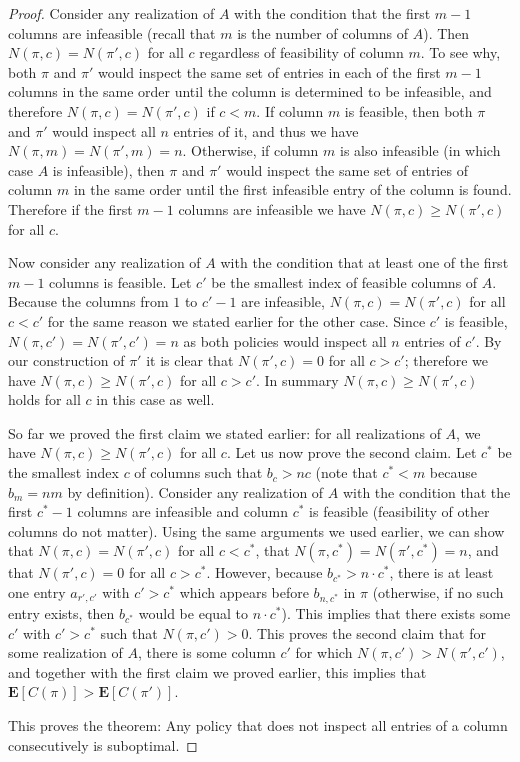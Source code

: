 \begin{proof}
 Consider any realization of $A$ with the condition that the first $m-1$ columns are infeasible (recall that $m$ is the number of columns of $A$).
 Then $N(\pi, c) = N(\pi', c)$ for all $c$ regardless of feasibility of column $m$.
 To see why, both $\pi$ and $\pi'$ would inspect the same set of entries in each of the first $m-1$ columns in the same order until the column is determined to be infeasible, and therefore $N(\pi, c) = N(\pi', c)$ if $c<m$.
 If column $m$ is feasible, then both $\pi$ and $\pi'$ would inspect all $n$ entries of it, and thus we have $N(\pi, m) = N(\pi', m) = n$. Otherwise, if column $m$ is also infeasible (in which case $A$ is infeasible), then $\pi$ and $\pi'$ would inspect the same set of entries of column $m$ in the same order until the first infeasible entry of the column is found. Therefore if the first $m-1$ columns are infeasible we have $N(\pi, c) \geq N(\pi', c)$ for all $c$.

 Now consider any realization of $A$ with the condition that at least one of the first $m-1$ columns is feasible. Let $c'$ be the smallest index of feasible columns of $A$.
 Because the columns from $1$ to $c'-1$ are infeasible, $N(\pi, c) = N(\pi', c)$ for all $c < c'$ for the same reason we stated earlier for the other case. 
 Since $c'$ is feasible, $N(\pi, c') = N(\pi', c') = n$ as both policies would inspect all $n$ entries of $c'$. By our construction of $\pi'$ it is clear that $N(\pi', c) = 0$ for all $c > c'$; therefore we have $N(\pi, c) \geq N(\pi', c)$ for all $c>c'$. In summary $N(\pi, c) \geq N(\pi', c)$ holds for all $c$ in this case as well. 

 So far we proved the first claim we stated earlier: for all realizations of $A$, we have $N(\pi, c) \geq N(\pi', c)$ for all $c$.
 Let us now prove the second claim. Let $c^*$ be the smallest index $c$ of columns such that $b_c > nc$ (note that $c^* < m$ because $b_m = nm$ by definition). 
 Consider any realization of $A$ with the condition that the first $c^*-1$ columns are infeasible and column $c^*$ is feasible (feasibility of other columns do not matter). 
 Using the same arguments we used earlier, we can show that $N(\pi, c) = N(\pi', c)$ for all $c < c^*$, that $N(\pi, c^*) = N(\pi', c^*) = n$, and that $N(\pi', c) = 0$ for all $c> c^*$. 
 However, because $b_{c^*} > n \cdot c^*$, there is at least one entry $a_{r',c'}$ with $c' > c^*$ which  appears before $b_{n, c^*}$ in $\pi$ (otherwise, if no such entry exists, then $b_{c^*}$ would be equal to $n \cdot c^*$). This implies that there exists some $c'$ with $c' > c^*$ such that $N(\pi, c') > 0$. 
 This proves the second claim that for some realization of $A$, there is some column $c'$ for which $N(\pi, c') >  N(\pi', c')$, and together with the first claim we proved earlier, this implies that $\mathbf{E}[C(\pi)] > \mathbf{E}[C(\pi')]$. 

 This proves the theorem: Any policy that does not inspect all entries of a column consecutively is suboptimal.
 \end{proof}
